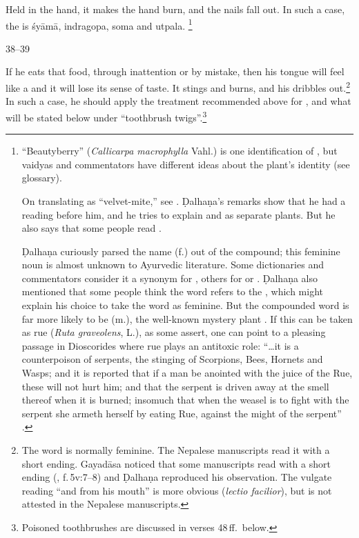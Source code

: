 \begin{translation}
Held in the hand, it makes the hand burn, and the nails fall out. In such a case,
the  is \gls{śyāmā}, %
\gls{indragopa}, %
soma and \gls{utpala}.%
\footnote{\label{beautyberry}“Beautyberry” (\emph{Callicarpa macrophylla} 
Vahl.) is one
identification of , but vaidyas and commentators have different ideas
about the plant's identity (see glossary).  
\par 
On translating  as “velvet-mite,”
see \cite{lien-1978}. Ḍalhaṇa's remarks show that he had a reading
 before him, and he tries to explain  and  as
separate plants.  But he also says that some people read . 
\par
 Ḍalhaṇa
curiously parsed the name  (f.) out of the compound; this feminine noun
is almost unknown to Ayurvedic literature.  Some dictionaries and commentators
consider it a synonym for , others for  or
.  Ḍalhaṇa also mentioned that some people think the word refers to
the , which might explain his choice to take the word as
feminine.  But the compounded word is far more likely to be  (m.), the
well-known mystery plant \citep[see][76--78, 125]{wuja-2003}.  If this can be
taken as rue (\emph{Ruta graveolens}, L.), as some assert, one can point to a
pleasing passage in Dioscorides where rue plays an antitoxic role: “\ldots it is a
counterpoison of serpents, the stinging of Scorpions, Bees, Hornets and Wasps; and
it is reported that if a man be anointed with the juice of the Rue, these will not
hurt him; and that the serpent is driven away at the smell thereof when it is
burned; insomuch that when the weasel is to fight with the serpent she armeth
herself by eating Rue, against the might of the serpent” \parencites[cited 
from][262]{wren-1956}[not found in][]{osba-dios}.}
     
     \item [38--39] 
     
If he eats that food, through inattention or by mistake, then his
tongue will feel like a  and it will lose its
sense of taste. It stings and %
burns, and his \label{saliva} dribbles
out.\footnote{The word  is normally feminine.   The
    Nepalese manuscripts read it with a short  ending.  Gayadāsa
    noticed that some manuscripts read  with a short 
    ending (, f.\,5v:7--8) and Ḍalhaṇa
    reproduced his observation.  The vulgate reading  “and
    from his mouth” is more obvious (\emph{lectio facilior}), but is not
    attested in the Nepalese manuscripts.} In such a case, he should apply
    the treatment recommended above for , and what will
    be stated below under “toothbrush twigs”.\footnote{Poisoned
        toothbrushes are discussed in verses 48\,ff.\ below.}
     

\end{translation}
